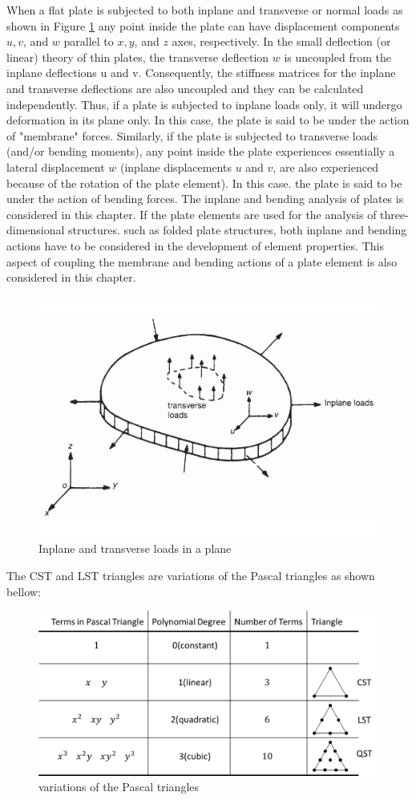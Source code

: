 When a flat plate is subjected to both inplane and transverse or normal loads as shown
in Figure \ref{fig: inplane transverse loads in plane} any point inside the plate can have displacement components $ u, v $, and
$ w $ parallel to $ x, y $, and $ z $ axes, respectively. In the small deflection (or linear) theory of thin plates, the transverse deflection $ w $ is uncoupled from the inplane deflections u and v. Consequently, the stiffness matrices for the inplane and transverse deflections are also uncoupled and they can be calculated independently. Thus, if a plate is subjected to inplane loads only, it will undergo deformation in its plane only. In this case, the plate is said to be under the action of "membrane" forces. Similarly, if the plate is subjected to transverse loads (and/or bending moments), any point inside the plate experiences
essentially a lateral displacement $ w $ (inplane displacements $ u $ and $ v $, are also experienced because of the rotation of the plate element). In this case. the plate is said to be under the action of bending forces. The inplane and bending analysis of plates is considered in this chapter. If the plate elements are used for the analysis of three-dimensional structures. such as folded plate structures, both inplane and bending actions have to be considered in the development of element properties. This aspect of coupling the membrane and bending actions of a plate element is also considered in this chapter.

\begin{figure}[h!]
\centering
\includegraphics[width=0.5\linewidth]{figures/plate_inplane_transverse_loads}
\caption{Inplane and transverse loads in a plane}
\label{fig: inplane transverse loads in plane}
\end{figure}

The CST and LST triangles are variations of the Pascal triangles as shown bellow:

\begin{figure}[h!]
\centering
\includegraphics[width=0.7\linewidth]{figures/plate_variations_pascal_triangles}
\caption{variations of the Pascal triangles}
\label{fig:plate_variations_pascal_triangles}
\end{figure}

\newpage







